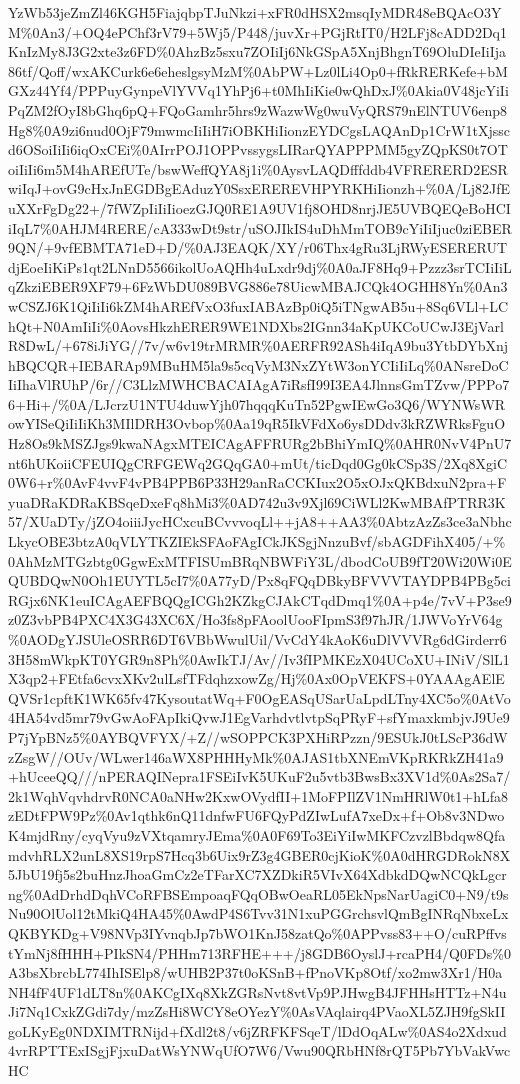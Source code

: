 \documentclass[]{article}
\begin{document}
YzWb53jeZmZl46KGH5FiajqbpTJuNkzi+xFR0dHSX2msqIyMDR48eBQAcO3YM\%0An3/+OQ4ePChf3rV79+5Wj5/P448/juvXr+PGjRtIT0/H2LFj8cADD2Dq1KnIzMy8J3G2xte3z6FD\%0AhzBz5sxu7ZOIiIj6NkGSpA5XnjBhgnT69OluDIeIiIja86tf/Qoff/wxAKCurk6e6eheslgsyMzM\%0AbPW+Lz0lLi4Op0+fRkRERKefe+bMGXz44Yf4/PPPuyGynpeVlYVVq1YhPj6+t0MhIiKie0wQhDxJ\%0Akia0V48jcYiIiPqZM2fOyI8bGhq6pQ+FQoGamhr5hrs9zWazwWg0wuVyQRS79nElNTUV6enp8Hg8\%0A9zi6nud0OjF79mwmcIiIiH7iOBKHiIionzEYDCgsLAQAnDp1CrW1tXjsscd6OSoiIiIi6iqOxCEi\%0AIrrPOJ1OPPvssygsLIRarQYAPPPMM5gyZQpKS0t7OToiIiIi6m5M4hAREfUTe/bswWeffQYA8j1i\%0AysvLAQDfffddb4VFRERERD2ESRwiIqJ+ovG9cHxJnEGDBgEAduzY0SsxEREREVHPYRKHiIionzh+\%0A/Lj82JfEuXXrFgDg22+/7fWZpIiIiIioezGJQ0RE1A9UV1fj8OHD8nrjJE5UVBQEQeBoHCIiIqL7\%0AHJM4RERE/cA333wDt9str/uSOJIkIS4uDhMmTOB9cYiIiIjuc0ziEBER9QN/+9vfEBMTA71eD+D/\%0AJ3EAQK/XY/r06Thx4gRu3LjRWyESERERUTdjEoeIiKiPs1qt2LNnD5566ikolUoAQHh4uLxdr9dj\%0A0aJF8Hq9+Pzzz3srTCIiIiLqZkziEBER9XF79+6FzWbDU089BVG886e78UicwMBAJCQk4OGHH8Yn\%0An3wCSZJ6K1QiIiIi6kZM4hAREfVxO3fuxIABAzBp0iQ5iTNgwAB5u+8Sq6VLl+LChQt+N0AmIiIi\%0AovsHkzhERER9WE1NDXbs2IGnn34aKpUKCoUCwJ3EjVarlR8DwL/+678iJiYG//7v/w6v19trMRMR\%0AERFR92ASh4iIqA9bu3YtbDYbXnjhBQCQR+IEBARAp9MBuHM5la9s5cqVyM3NxZYtW3onYCIiIiLq\%0ANsreDoCIiIhaVlRUhP/6r//C3LlzMWHCBACAIAgA7iRsfI99I3EA4JlnnsGmTZvw/PPPo76+Hi+/\%0A/LJcrzU1NTU4duwYjh07hqqqKuTn52PgwIEwGo3Q6/WYNWsWRowYISeQiIiIiKh3MIlDRH3Ovbop\%0Aa19qR5IkVFdXo6ysDDdv3kRZWRksFguOHz8Os9kMSZJgs9kwaNAgxMTEICAgAFFRURg2bBhiYmIQ\%0AHR0NvV4PnU7nt6hUKoiiCFEUIQgCRFGEWq2GQqGA0+mUt/ticDqd0Gg0kCSp3S/2Xq8XgiC0W6+r\%0AvF4vvF4vPB4PPB6P33H29anRaCCKIux2O5xOJxQKBdxuN2pra+FyuaDRaKDRaKBSqeDxeFq8hMi3\%0AD742u3v9Xjl69CiWLl2KwMBAfPTRR3K57/XUaDTy/jZO4oiiiJycHCxcuBCvvvoqLl++jA8++AA3\%0AbtzAzZs3ce3aNbhcLkycOBE3btzA0qVLYTKZIEkSFAoFAgICkJKSgjNnzuBvf/sbAGDFihX405/+\%0AhMzMTGzbtg0GgwExMTFISUmBRqNBWFiY3L/dbodCoUB9fT20Wi20Wi0EQUBDQwN0Oh1EUYTL5cI7\%0A77yD/Px8qFQqDBkyBFVVVTAYDPB4PBg5ciRGjx6NK1euICAgAEFBQQgICGh2KZkgCJAkCTqdDmq1\%0A+p4e/7vV+P3se9z0Z3vbPB4PXC4X3G43XC6X/Ho3fs8pFAoolUooFIpmS3f97hJR/1JWVoYrV64g\%0AODgYJSUleOSRR6DT6VBbWwulUil/VvCdY4kAoK6uDlVVVRg6dGirderr63H58mWkpKT0YGR9n8Ph\%0AwIkTJ/Av//Iv3fIPMKEzX04UCoXU+INiV/SlL1X3qp2+FEtfa6cvxXKv2ulLsfTFdqhzxowZg/Hj\%0Ax0OpVEKFS+0YAAAgAElEQVSr1cpftK1WK65fv47KysoutatWq+F0OgEASqUSarUaLpdLTny4XC5o\%0AtVo4HA54vd5mr79vGwAoFApIkiQvwJ1EgVarhdvtlvtpSqPRyF+sfYmaxkmbjvJ9Ue9P7jYpBNz5\%0AYBQVFYX/+Z//wSOPPCK3PXHiRPzzn/9ESUkJ0tLScP36dWzZsgW//OUv/WLwer146aWX8PHHHyMk\%0AJAS1tbXNEmVKpRKRkZH41a9+hUceeQQ///nPERAQINepra1FSEiIvK5UKuF2u5vtb3BwsBx3XV1d\%0As2Sa7/2k1WqhVqvhdrvR0NCA0aNHw2KxwOVydfII+1MoFPIlZV1NmHRlW0t1+hLfa8zEDtFPW9Pz\%0Av1qthk6nQ11dnfwFU6FQyPdZIwLufA7xeDx+f+Ob8v3NDwoK4mjdRny/cyqVyu9zVXtqamryJEma\%0A0F69To3EiYiIwMKFCzvzlBbdqw8QfamdvhRLX2unL8XS19rpS7Hcq3b6Uix9rZ3g4GBER0cjKioK\%0A0dHRGDRokN8X5JbU19fj5s2buHnzJhoaGmCz2eTFarXC7XZDkiR5VIvX64XdbkdDQwNCQkLgcrng\%0AdDrhdDqhVCoRFBSEmpoaqFQqOBwOeaRL05EkNpsNarUagiC0+N9/t9sNu90OlUol12tMkiQ4HA45\%0AwdP4S6Tvv31N1xuPGGrchsvlQmBgINRqNbxeLxQKBYKDg+V98NVp3IYvnqbJp7bWO1KnJ58zatQo\%0APPvss83++O/cuRPffvstYmNj8fHHH+PIkSN4/PHHm713RFHE+++/j8GDB6OyslJ+rcaPH4/Q0FDs\%0A3bsXbrcbL774IhISElp8/wUHB2P37t0oKSnB+fPnoVKp8Otf/xo2mw3Xr1/H0aNH4fF4UF1dLT8n\%0AKCgIXq8XkZGRsNvt8vtVp9PJHwgB4JFHHsHTTz+N4uJi7Nq1CxkZGdi7dy/mzZsHi8WCY8eOYezY\%0AsVAqlairq4PVaoXL5ZJH9fgSkIIgoLKyEg0NDXIMTRNijd+fXdl2t8/v6jZRFKFSqeT/lDdOqALw\%0AS4o2Xdxud4vrRPTTExISgjFjxuDatWsYNWqUfO7W6/Vwu90QRbHNf8rQT5Pb7YbVakVwcHC
\end{document}
